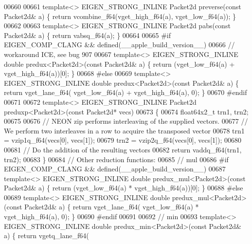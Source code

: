 \begin{DoxyCode}
{{00660 
00661 \textcolor{keyword}{template}<> EIGEN\_STRONG\_INLINE Packet2d preverse(\textcolor{keyword}{const} Packet2d& a) \{ \textcolor{keywordflow}{return} vcombine\_f64(vget\_high\_f64(a),
       vget\_low\_f64(a)); \}
00662 
00663 \textcolor{keyword}{template}<> EIGEN\_STRONG\_INLINE Packet2d pabs(\textcolor{keyword}{const} Packet2d& a) \{ \textcolor{keywordflow}{return} vabsq\_f64(a); \}
00664 
00665 \textcolor{preprocessor}{#if EIGEN\_COMP\_CLANG && defined(\_\_apple\_build\_version\_\_)}
00666 \textcolor{comment}{// workaround ICE, see bug 907}
00667 \textcolor{keyword}{template}<> EIGEN\_STRONG\_INLINE \textcolor{keywordtype}{double} predux<Packet2d>(\textcolor{keyword}{const} Packet2d& a) \{ \textcolor{keywordflow}{return} (vget\_low\_f64(a) + 
      vget\_high\_f64(a))[0]; \}
00668 \textcolor{preprocessor}{#else}
00669 \textcolor{keyword}{template}<> EIGEN\_STRONG\_INLINE \textcolor{keywordtype}{double} predux<Packet2d>(\textcolor{keyword}{const} Packet2d& a) \{ \textcolor{keywordflow}{return} vget\_lane\_f64(
      vget\_low\_f64(a) + vget\_high\_f64(a), 0); \}
00670 \textcolor{preprocessor}{#endif}
00671 
00672 \textcolor{keyword}{template}<> EIGEN\_STRONG\_INLINE Packet2d preduxp<Packet2d>(\textcolor{keyword}{const} Packet2d* vecs)
00673 \{
00674   float64x2\_t trn1, trn2;
00675 
00676   \textcolor{comment}{// NEON zip performs interleaving of the supplied vectors.}
00677   \textcolor{comment}{// We perform two interleaves in a row to acquire the transposed vector}
00678   trn1 = vzip1q\_f64(vecs[0], vecs[1]);
00679   trn2 = vzip2q\_f64(vecs[0], vecs[1]);
00680 
00681   \textcolor{comment}{// Do the addition of the resulting vectors}
00682   \textcolor{keywordflow}{return} vaddq\_f64(trn1, trn2);
00683 \}
00684 \textcolor{comment}{// Other reduction functions:}
00685 \textcolor{comment}{// mul}
00686 \textcolor{preprocessor}{#if EIGEN\_COMP\_CLANG && defined(\_\_apple\_build\_version\_\_)}
00687 \textcolor{keyword}{template}<> EIGEN\_STRONG\_INLINE \textcolor{keywordtype}{double} predux\_mul<Packet2d>(\textcolor{keyword}{const} Packet2d& a) \{ \textcolor{keywordflow}{return} (vget\_low\_f64(a) * 
      vget\_high\_f64(a))[0]; \}
00688 \textcolor{preprocessor}{#else}
00689 \textcolor{keyword}{template}<> EIGEN\_STRONG\_INLINE \textcolor{keywordtype}{double} predux\_mul<Packet2d>(\textcolor{keyword}{const} Packet2d& a) \{ \textcolor{keywordflow}{return} vget\_lane\_f64(
      vget\_low\_f64(a) * vget\_high\_f64(a), 0); \}
00690 \textcolor{preprocessor}{#endif}
00691 
00692 \textcolor{comment}{// min}
00693 \textcolor{keyword}{template}<> EIGEN\_STRONG\_INLINE \textcolor{keywordtype}{double} predux\_min<Packet2d>(\textcolor{keyword}{const} Packet2d& a) \{ \textcolor{keywordflow}{return} vgetq\_lane\_f64(
}}
\end{DoxyCode}
